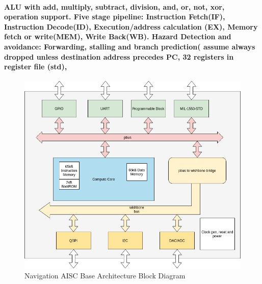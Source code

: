\documentclass[12pt,a4paper]{report}
\begin{document}
\paragraph{\textrm{\textmd{ALU with add, multiply, subtract, division, and, or, not, xor, operation support.
Five stage pipeline: Instruction Fetch(IF), Instruction Decode(ID), Execution/address calculation (EX), Memory fetch or write(MEM), Write Back(WB).
Hazard Detection and avoidance: Forwarding, stalling and branch prediction( assume always dropped unless destination address precedes PC,
32 registers in register file (std),}}}
\begin{figure}[h]
	\centering
	\includegraphics[scale=.35]{nasic2.png}
	\caption{Navigation AISC Base Architecture Block Diagram}
\end{figure}
\end{document}
